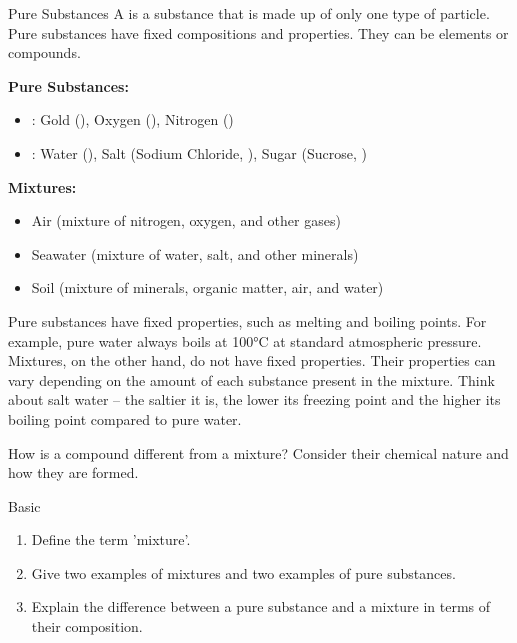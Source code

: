 \begin{keyconcept}{Pure Substances}
A  is a substance that is made up of only one type of particle. Pure substances have fixed compositions and properties. They can be elements or compounds.
\end{keyconcept}

\begin{example}
\textbf{Pure Substances:}
\begin{itemize}
    \item {}: Gold (), Oxygen (), Nitrogen ()
    \item {}: Water (), Salt (Sodium Chloride, ), Sugar (Sucrose, )
\end{itemize}
\textbf{Mixtures:}
\begin{itemize}
    \item Air (mixture of nitrogen, oxygen, and other gases)
    \item Seawater (mixture of water, salt, and other minerals)
    \item Soil (mixture of minerals, organic matter, air, and water)
\end{itemize}
\end{example}


Pure substances have fixed properties, such as melting and boiling points. For example, pure water always boils at 100°C at standard atmospheric pressure. Mixtures, on the other hand, do not have fixed properties. Their properties can vary depending on the amount of each substance present in the mixture.  Think about salt water – the saltier it is, the lower its freezing point and the higher its boiling point compared to pure water.

\begin{stopandthink}
How is a compound different from a mixture? Consider their chemical nature and how they are formed.
\end{stopandthink}

\begin{tieredquestions}{Basic}
\begin{enumerate}
    \item Define the term 'mixture'.
    \item Give two examples of mixtures and two examples of pure substances.
    \item Explain the difference between a pure substance and a mixture in terms of their composition.
\end{enumerate}
\end{tieredquestions}


